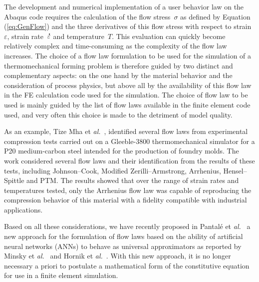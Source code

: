 \documentclass[algorithms,article,submit,pdftex,oneauthors]{Definitions/mdpi}
\makeatletter
\DeclareRobustCommand{\mdot}[1]{\accentset{\mbox{\bfseries .}}{#1}}
\DeclareRobustCommand{\eal}{et \emph{al.}\@\xspace}
\makeatother
\begin{document}
The development and numerical implementation of a user behavior law on the Abaqus code requires the calculation of the flow stress~$\sigma$ as defined by Equation (\ref{eq:GenFlow}) and the three derivatives of this flow stress with respect to strain~$\varepsilon$, strain rate~$\mdot{\varepsilon}$ and temperature~$T$.
This evaluation can quickly become relatively complex and time-consuming as the complexity of the flow law increases.
The choice of a flow law formulation to be used for the simulation of a thermomechanical forming problem is therefore guided by two distinct and complementary aspects: on the one hand by the material behavior and the consideration of process physics, but above all by the availability of this flow law in the FE calculation code used for the simulation.
The choice of flow law to be used is mainly guided by the list of flow laws available in the finite element code used, and very often this choice is made to the detriment of model quality.

As an example, Tize Mha \eal~\cite{Tize-2023-IEP}, identified several flow laws from experimental compression tests carried out on a Gleeble-3800 thermomechanical simulator for a P20 medium-carbon steel intended for the production of foundry molds.
The work considered several flow laws and their identification from the results of these tests, including Johnson--Cook, Modified Zerilli--Armstrong, Arrhenius, Hensel--Spittle and PTM.
The results showed that over the range of strain rates and temperatures tested, only the Arrhenius flow law was capable of reproducing the compression behavior of this material with a fidelity compatible with industrial applications.

Based on all these considerations, we have recently proposed in Pantalé \eal~\cite{Pantale-2021-EIN, Pantale-2023-DIA} a new approach for the formulation of flow laws based on the ability of artificial neural networks (ANNs) to behave as universal approximators as reported by Minsky \eal~\cite{Minsky-1969-PIC} and Hornik \eal~\cite{Hornik-1989-MFN}.
With this new approach, it is no longer necessary a priori to postulate a mathematical form of the constitutive equation for use in a finite element simulation.
\end{document}

